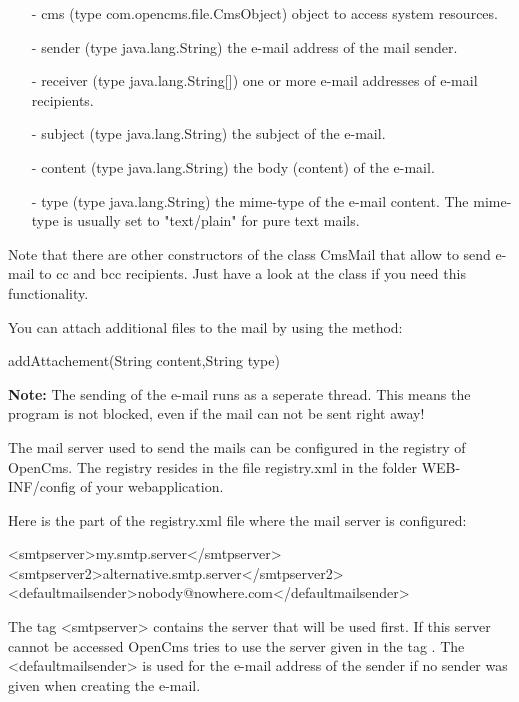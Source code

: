 \begin{itemize}
\item[-] cms (type {\code com.opencms.file.CmsObject}) object to access system resources.
\item[-] sender (type {\code java.lang.String}) the e-mail address of the mail sender.
\item[-] receiver (type {\code java.lang.String[]}) one or more e-mail addresses of e-mail recipients.
\item[-] subject (type {\code java.lang.String}) the subject of the e-mail.
\item[-] content (type {\code java.lang.String}) the body (content) of the e-mail.
\item[-] type (type {\code java.lang.String}) the mime-type of the e-mail content.
The mime-type is usually set to "text/plain" for pure text mails.
\end{itemize}

Note that there are other constructors of the class {\class CmsMail} that allow to send e-mail
to cc and bcc recipients. Just have a look at the class if you need this functionality.

You can attach additional files to the mail by using the method:

{\meth  addAttachement(String content,String type)} 

{\bf Note:} The sending of the e-mail runs as a seperate thread. This means the program is not
blocked, even if the mail can not be sent right away!

The mail server used to send the mails can be configured in the registry of OpenCms.
The registry resides in the file {\name registry.xml} in the folder {\dir WEB-INF/config}
of your webapplication.

Here is the part of the {\name registry.xml} file where the mail server is configured:

\begin{xml}
<smtpserver>my.smtp.server</smtpserver>
<smtpserver2>alternative.smtp.server</smtpserver2>
<defaultmailsender>nobody@nowhere.com</defaultmailsender>
\end{xml}

The tag {\code <smtpserver>} contains the server that will be used first.
If this server cannot be accessed OpenCms tries to use the server given in the tag
{}.
The {\code <defaultmailsender>} is used for the e-mail address of the sender
if no sender was given when creating the e-mail.


